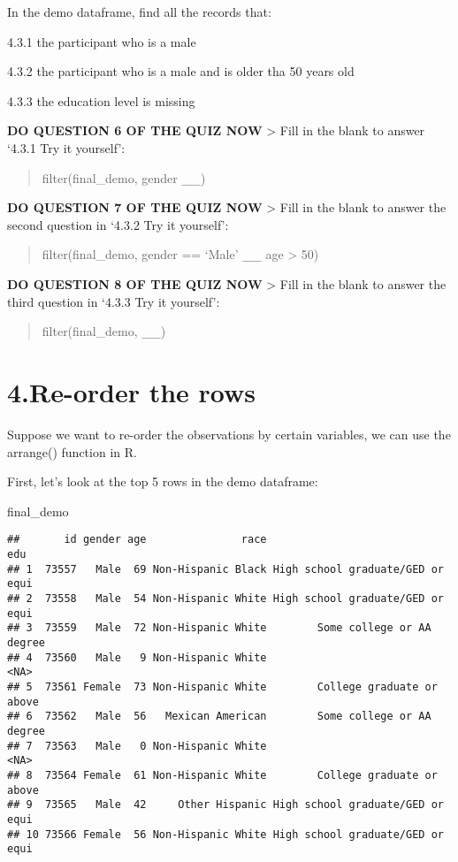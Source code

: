 \documentclass[
]{book}
\newenvironment{Shaded}{\begin{snugshade}}{\end{snugshade}}
\newcommand{\NormalTok}[1]{#1}
\begin{document}
In the demo dataframe, find all the records that:

4.3.1 the participant who is a male

4.3.2 the participant who is a male and is older tha 50 years old

4.3.3 the education level is missing

\textbf{DO QUESTION 6 OF THE QUIZ NOW}
\textgreater{} Fill in the blank to answer `4.3.1 Try it yourself':

\begin{quote}
filter(final\_demo, gender \texttt{\_\_\_})
\end{quote}

\textbf{DO QUESTION 7 OF THE QUIZ NOW}
\textgreater{} Fill in the blank to answer the second question in `4.3.2 Try it yourself':

\begin{quote}
filter(final\_demo, gender == `Male' \texttt{\_\_\_} age \textgreater{} 50)
\end{quote}

\textbf{DO QUESTION 8 OF THE QUIZ NOW}
\textgreater{} Fill in the blank to answer the third question in `4.3.3 Try it yourself':

\begin{quote}
filter(final\_demo, \texttt{\_\_\_})
\end{quote}

\hypertarget{re-order-the-rows}{%
\section{4.Re-order the rows}\label{re-order-the-rows}}

Suppose we want to re-order the observations by certain variables, we can use the arrange() function in R.

First, let's look at the top 5 rows in the demo dataframe:

\begin{Shaded}
\begin{Highlighting}[]
\NormalTok{final\_demo}
\end{Highlighting}
\end{Shaded}

\begin{verbatim}
##       id gender age               race                              edu
## 1  73557   Male  69 Non-Hispanic Black High school graduate/GED or equi
## 2  73558   Male  54 Non-Hispanic White High school graduate/GED or equi
## 3  73559   Male  72 Non-Hispanic White        Some college or AA degree
## 4  73560   Male   9 Non-Hispanic White                             <NA>
## 5  73561 Female  73 Non-Hispanic White        College graduate or above
## 6  73562   Male  56   Mexican American        Some college or AA degree
## 7  73563   Male   0 Non-Hispanic White                             <NA>
## 8  73564 Female  61 Non-Hispanic White        College graduate or above
## 9  73565   Male  42     Other Hispanic High school graduate/GED or equi
## 10 73566 Female  56 Non-Hispanic White High school graduate/GED or equi
\end{verbatim}
\end{document}
